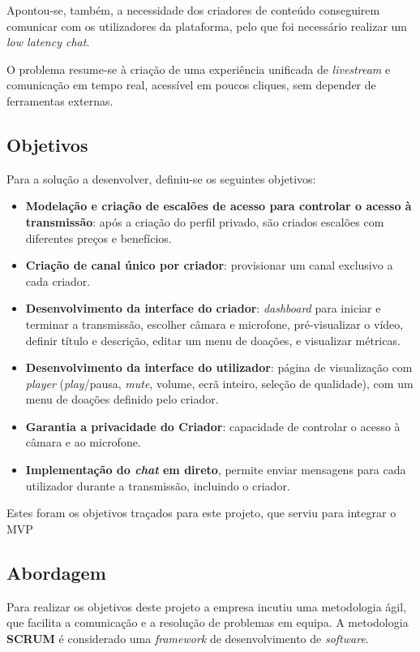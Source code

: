 Apontou-se, também, a necessidade dos criadores de conteúdo conseguirem comunicar com os utilizadores da plataforma, pelo que foi necessário realizar um \textit{low latency chat}.

O problema resume-se à criação de uma experiência unificada de \textit{livestream} e comunicação em tempo real, acessível em poucos cliques, sem depender de ferramentas externas.
 

\subsection{Objetivos} 

Para a solução a desenvolver, definiu-se os seguintes objetivos:
\begin{itemize}
    \item \textbf{Modelação e criação de escalões de acesso para controlar o acesso à transmissão}: após a criação do perfil privado, são criados escalões com diferentes preços e benefícios.
    \item \textbf{Criação de canal único por criador}: provisionar um canal exclusivo a cada criador.
    \item \textbf{Desenvolvimento da interface do criador}: \textit{dashboard} para iniciar e terminar a transmissão, escolher câmara e microfone, pré-visualizar o vídeo, definir título e descrição, editar um menu de doações, e visualizar métricas.
    \item \textbf{Desenvolvimento da interface do utilizador}: página de visualização com \textit{player} (\textit{play}/pausa, \textit{mute}, volume, ecrã inteiro, seleção de qualidade), com um menu de doações definido pelo criador.
    \item \textbf{Garantia a privacidade do Criador}: capacidade de controlar o acesso à câmara e ao microfone.
    \item \textbf{Implementação do \textit{chat} em direto}, permite enviar mensagens para cada utilizador durante a transmissão, incluindo o criador.
\end{itemize}

Estes foram os objetivos traçados para este projeto, que serviu para integrar o \gls{MVP}

\subsection{Abordagem} 

Para realizar os objetivos deste projeto a empresa incutiu uma metodologia ágil, que facilita a comunicação e a resolução de problemas em equipa. A metodologia \textbf{SCRUM} é considerado uma \textit{framework} de desenvolvimento de \textit{software}.

